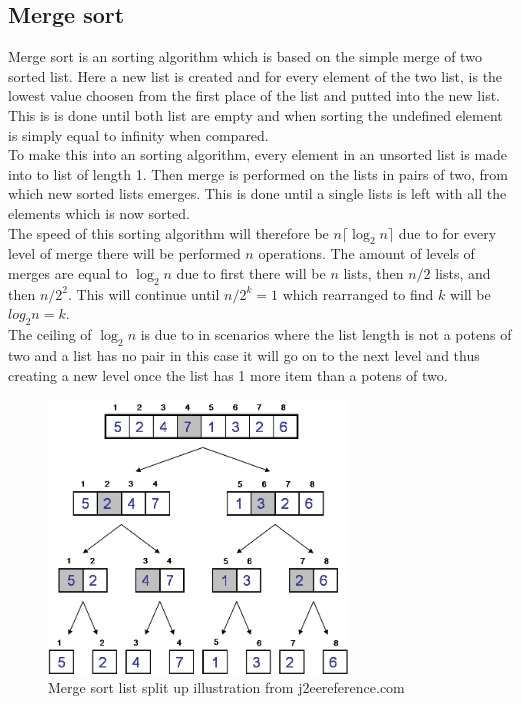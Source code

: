 \documentclass[12pt, a4paper]{article}
\begin{document}
			\subsection{Merge sort}
				Merge sort is an sorting algorithm which is based on the simple merge of two sorted list. Here a new list is created and for every element of the two list, is the lowest value choosen from the first place of the list and putted into the new list. This is is done until both list are empty and when sorting the undefined element is simply equal to infinity when compared.\\[5mm]
				To make this into an sorting algorithm, every element in an unsorted list is made into to list of length 1. Then merge is performed on the lists in pairs of two, from which new sorted lists emerges. This is done until a single lists is left with all the elements which is now sorted. \\[4mm]
				 The speed of this sorting algorithm will therefore be $n\lceil\log_2n\rceil$ due to for every level of merge there will be performed $n$ operations. The amount of levels of merges are equal to $\log_2n$ due to first there will be $n$ lists, then $n/2$ lists, and then $n/2^2$. This will continue until $n/2^k=1$ which rearranged to find $k$ will be $log_2n=k$.\\
				 The ceiling of $\log_2n$ is due to in scenarios where the list length is not a potens of two and a list has no pair in this case it will go on to the next level and thus creating a new level once the list has 1 more item than a potens of two.
				 \begin{figure}
				 	\centering
				 	\includegraphics[width=300px]{assets/mergeSort.png}
				 	\caption{Merge sort list split up illustration from j2eereference.com}
				\end{figure}
\end{document}

